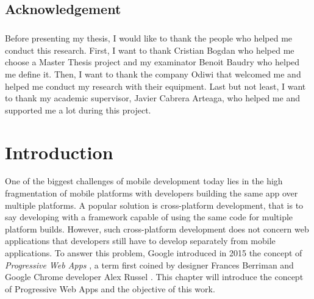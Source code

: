 \documentclass{kththesis}
\begin{document}
\section*{Acknowledgement}
\paragraph{}
Before presenting my thesis, I would like to thank the people who helped me conduct this research. First, I want to thank Cristian Bogdan who helped me choose a Master Thesis project and my examinator Benoit Baudry who helped me define it. 
Then, I want to thank the company Odiwi that welcomed me and helped me conduct my research with their equipment. Last but not least, I want to thank my academic supervisor, Javier Cabrera Arteaga, who helped me and supported me a lot during this project. 

\tableofcontents


\mainmatter


\chapter{Introduction}


\indent 

One of the biggest challenges of mobile development today lies in the high fragmentation of mobile platforms \cite{MobileDevChallenges} with developers building the same app over multiple platforms. A popular solution is cross-platform development, that is to say developing with a framework capable of using the same code for multiple platform builds. However, such cross-platform development does not concern web applications that developers still have to develop separately from mobile applications. To answer this problem, Google introduced in 2015 the concept of \textit{Progressive Web Apps} \cite{PWA_intro}, a term first coined by designer Frances Berriman and Google Chrome developer Alex Russel \cite{PWA_blog, PWApossibleUnifer}.
This chapter will introduce the concept of Progressive Web Apps and the objective of this work.
\end{document}
